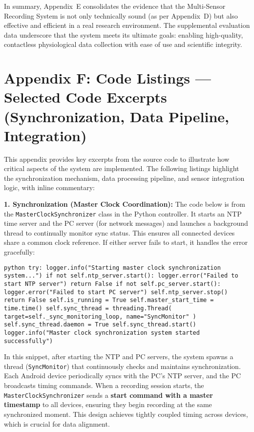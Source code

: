 {In summary, Appendix E consolidates the evidence that the Multi-Sensor
Recording System is not only technically sound (as per Appendix D) but
also effective and efficient in a real research environment. The
supplemental evaluation data underscore that the system meets its
ultimate goals: enabling high-quality, contactless physiological data
collection with ease of use and scientific integrity.

\section{Appendix F: Code Listings --- Selected Code Excerpts (Synchronization, Data Pipeline, Integration)}

This appendix provides key excerpts from the source code to illustrate
how critical aspects of the system are implemented. The following
listings highlight the synchronization mechanism, data processing
pipeline, and sensor integration logic, with inline commentary:

\textbf{1. Synchronization (Master Clock Coordination):} The code below is
from the \texttt{MasterClockSynchronizer} class in the Python controller. It
starts an NTP time server and the PC server (for network messages) and
launches a background thread to continually monitor sync status. This
ensures all connected devices share a common clock reference. If either
server fails to start, it handles the error
gracefully\cite{ref50}\cite{ref51}:

\texttt{python try: logger.info("Starting master clock synchronization system...") if not self.ntp_server.start(): logger.error("Failed to start NTP server") return False if not self.pc_server.start(): logger.error("Failed to start PC server") self.ntp_server.stop() return False self.is_running = True self.master_start_time = time.time() self.sync_thread = threading.Thread( target=self._sync_monitoring_loop, name="SyncMonitor" ) self.sync_thread.daemon = True self.sync_thread.start() logger.info("Master clock synchronization system started successfully")}\cite{ref52}

In this snippet, after starting the NTP and PC servers, the system
spawns a thread (\texttt{SyncMonitor}) that continuously checks and maintains
synchronization. Each Android device periodically syncs with the PC's
NTP server, and the PC broadcasts timing commands. When a recording
session starts, the \texttt{MasterClockSynchronizer} sends a \textbf{start command
with a master timestamp} to all devices, ensuring they begin recording
at the same synchronized
moment\cite{ref53}.
This design achieves tightly coupled timing across devices, which is
crucial for data alignment.

}
